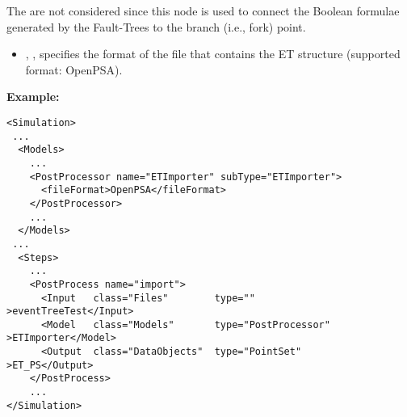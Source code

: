 The  are not considered since this node is used to connect the Boolean formulae generated by the
Fault-Trees to the branch (i.e., fork) point.

%
%
\begin{itemize}
  \item {}, , specifies the format of the file that contains the ET structure (supported format: OpenPSA).
\end{itemize}

\textbf{Example:}

\begin{lstlisting}[style=XML]
<Simulation>
 ...
  <Models>
    ...
    <PostProcessor name="ETImporter" subType="ETImporter">
      <fileFormat>OpenPSA</fileFormat>
    </PostProcessor>
    ...
  </Models>
 ...
  <Steps>
    ...
    <PostProcess name="import">
      <Input   class="Files"        type=""                >eventTreeTest</Input>
      <Model   class="Models"       type="PostProcessor"   >ETImporter</Model>
      <Output  class="DataObjects"  type="PointSet"        >ET_PS</Output>
    </PostProcess>
    ...
</Simulation>
\end{lstlisting}



